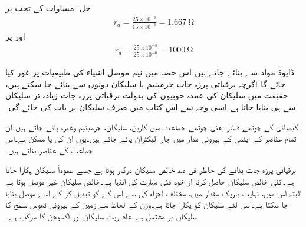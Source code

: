 حل:	مساوات   کے تحت  پر
\begin{align}
r_d =\frac{25 \times 10^{-3}}{15 \times 10^{-3}}=\SI{1.667}{\ohm}
\end{align}
اور  پر
\begin{align}
r_d =\frac{25 \times 10^{-3}}{25 \times 10^{-6}}=\SI{1000}{\ohm}
\end{align}

 ڈایوڈ  مواد سے بنائے جاتے ہیں۔اس حصہ میں نیم موصل اشیاء کی طبیعیات پر غور کیا جائے گا۔اگرچہ برقیاتی پرزہ جات جرمینیم یا سلیکان دونوں سے بنائے جا سکتے ہیں، حقیقت میں سلیکان کی عمدہ خوبیوں کی بدولت برقیاتی پرزہ جات زیادہ تر سلیکان سے ہی بنایا جاتا ہے۔اسی وجہ سے اس کتاب میں صرف سلیکان پر بات کی جائے گی۔

کیمیائی   کے چوتھے قطار یعنی چوتھے جماعت  میں کاربن، سلیکان، جرمینیم وغیرہ پائے جاتے ہیں۔ان تمام عناصر کے ایٹمی   کے بیرونی مدار میں چار الیکٹران  پائے جاتے ہیں۔یوں ان کی        یا  ممکن ہے۔اس جماعت کے عناصر   بناتے ہیں۔

برقیاتی پرزہ جات بنانے کی خاطر  فی صد خالص سلیکان درکار ہوتا ہے جسے عموماً  سلیکان پکارا جاتا ہے۔اتنی خالص سلیکان حاصل کرنا از خود فنی مہارت کی انتہا ہے۔خالص سلیکان غیر موصل ہوتا ہے البتہ اس میں، نہایت باریک مقدار میں، مختلف اجزاء کی   سے اس کے  کو تبدیل کر کے اسے موصل بنایا جا سکتا ہے۔اسی لئے سلیکان کو   پکارا جاتا ہے۔وزن کے لحاظ سے زمین کے بیرونی ٹھوس سطح کا  سلیکان پر مشتمل ہے۔عام ریت سلیکان اور آکسیجن کا مرکب  ہے۔

